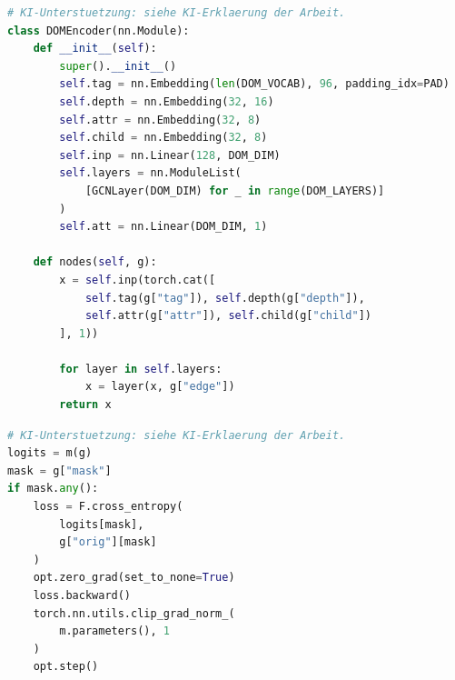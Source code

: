 \par\medskip\noindent\begin{minipage}{\dimexpr\linewidth-1em\relax}
\begin{lstlisting}[language=Python,caption={GCN-basierte Repräsentation des statischen DOM -- gekürzter Originalausschnitt},label={lst:dom_encoder}]
# KI-Unterstuetzung: siehe KI-Erklaerung der Arbeit.
class DOMEncoder(nn.Module):
    def __init__(self):
        super().__init__()
        self.tag = nn.Embedding(len(DOM_VOCAB), 96, padding_idx=PAD)
        self.depth = nn.Embedding(32, 16)
        self.attr = nn.Embedding(32, 8)
        self.child = nn.Embedding(32, 8)
        self.inp = nn.Linear(128, DOM_DIM)
        self.layers = nn.ModuleList(
            [GCNLayer(DOM_DIM) for _ in range(DOM_LAYERS)]
        )
        self.att = nn.Linear(DOM_DIM, 1)

    def nodes(self, g):
        x = self.inp(torch.cat([
            self.tag(g["tag"]), self.depth(g["depth"]),
            self.attr(g["attr"]), self.child(g["child"])
        ], 1))

        for layer in self.layers:
            x = layer(x, g["edge"])
        return x
\end{lstlisting}
\end{minipage}\par\medskip

\par\medskip\noindent\begin{minipage}{\dimexpr\linewidth-1em\relax}
\begin{lstlisting}[language=Python,caption={Rekonstruktionsverlust des DOM-SSL -- gekürzter Originalausschnitt aus dem Trainingsloop},label={lst:dom_ssl}]
# KI-Unterstuetzung: siehe KI-Erklaerung der Arbeit.
logits = m(g)
mask = g["mask"]
if mask.any():
    loss = F.cross_entropy(
        logits[mask],
        g["orig"][mask]
    )
    opt.zero_grad(set_to_none=True)
    loss.backward()
    torch.nn.utils.clip_grad_norm_(
        m.parameters(), 1
    )
    opt.step()
\end{lstlisting}
\end{minipage}\par\medskip

